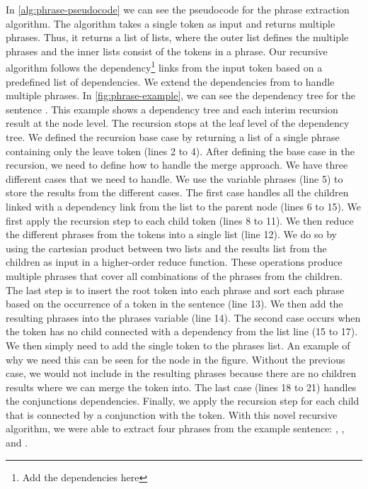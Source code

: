 In \autoref{alg:phrase-pseudocode} we can see the pseudocode for the phrase extraction algorithm.
The algorithm takes a single token as input and returns multiple phrases.
Thus, it returns a list of lists, where the outer list defines the multiple phrases and the inner lists consist of the tokens in a phrase.
Our recursive algorithm follows the dependency\footnote{Add the dependencies here} links from the input token based on a predefined list of dependencies.
We extend the dependencies from \cite{sharp2016creating} to handle multiple phrases.
In \autoref{fig:phrase-example}, we can see the dependency tree for the sentence .
This example shows a dependency tree and each interim recursion result at the node level.
The recursion stops at the leaf level of the dependency tree.
We defined the recursion base case by returning a list of a single phrase containing only the leave token (lines 2 to 4).
After defining the base case in the recursion, we need to define how to handle the merge approach.
We have three different cases that we need to handle.
We use the variable phrases (line 5) to store the results from the different cases.
The first case handles all the children linked with a dependency link from the list to the parent node (lines 6 to 15).
We first apply the recursion step to each child token (lines 8 to 11).
We then reduce the different phrases from the tokens into a single list (line 12).
We do so by using the cartesian product between two lists and the results list from the children as input in a higher-order reduce function.
These operations produce multiple phrases that cover all combinations of the phrases from the children.
The last step is to insert the root token into each phrase and sort each phrase based on the occurrence of a token in the sentence (line 13).
We then add the resulting phrases into the phrases variable (line 14).
The second case occurs when the token has no child connected with a dependency from the list line (15 to 17).
We then simply need to add the single token to the phrases list.
An example of why we need this can be seen for the node  in the figure.
Without the previous case, we would not include  in the resulting phrases because there are no children results where we can merge the token into.
The last case (lines 18 to 21) handles the conjunctions dependencies.
Finally, we apply the recursion step for each child that is connected by a conjunction with the token.
With this novel recursive algorithm, we were able to extract four phrases from the example sentence: , ,  and .


